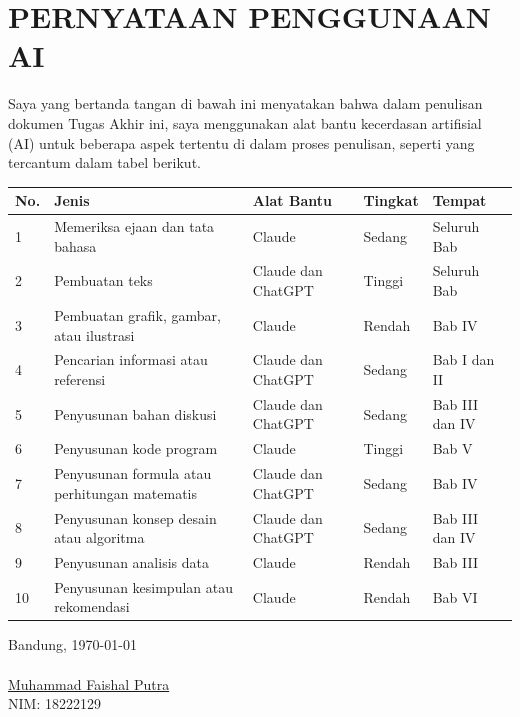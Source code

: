 \chapter*{PERNYATAAN PENGGUNAAN AI}
Saya yang bertanda tangan di bawah ini menyatakan bahwa dalam penulisan dokumen Tugas Akhir ini,
saya menggunakan alat bantu kecerdasan artifisial (AI) untuk beberapa aspek tertentu di dalam proses penulisan,
seperti yang tercantum dalam tabel berikut.
\begin{table}[h]
\begin{tabular}{|p{0.5cm}| p{4cm} | p{2.5cm} | p{2.5cm} | p{3cm} @{}| }
\hline
\textbf{No.} & \textbf{Jenis} & \textbf{Alat Bantu} & \textbf{Tingkat} & \textbf{Tempat}\\
\hline
1 & Memeriksa ejaan dan tata bahasa & Claude & Sedang & Seluruh Bab \\
\hline
2 & Pembuatan teks & Claude dan ChatGPT & Tinggi & Seluruh Bab \\
\hline
3 & Pembuatan grafik, gambar, atau ilustrasi & Claude & Rendah & Bab IV \\
\hline
4 & Pencarian informasi atau referensi & Claude dan ChatGPT & Sedang & Bab I dan II \\
\hline
5 & Penyusunan bahan diskusi & Claude dan ChatGPT & Sedang & Bab III dan IV \\
\hline
6 & Penyusunan kode program & Claude & Tinggi & Bab V \\
\hline
7 & Penyusunan formula atau perhitungan matematis & Claude dan ChatGPT & Sedang & Bab IV \\
\hline
8 & Penyusunan konsep desain atau algoritma & Claude dan ChatGPT & Sedang & Bab III dan IV \\
\hline
9 & Penyusunan analisis data & Claude & Rendah & Bab III \\
\hline
10 & Penyusunan kesimpulan atau rekomendasi & Claude & Rendah & Bab VI \\
\hline
\end{tabular}
\end{table}


Bandung, \today\\
\\[2cm]

\underline{Muhammad Faishal Putra} \\
NIM: 18222129